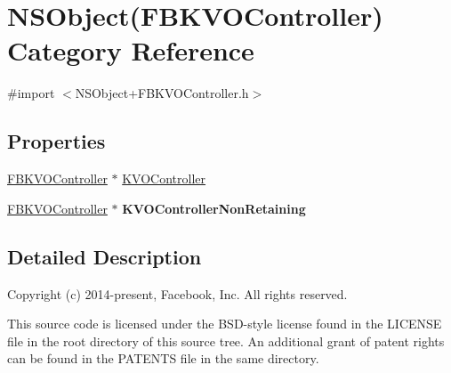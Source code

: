 \hypertarget{category_n_s_object_07_f_b_k_v_o_controller_08}{\section{N\+S\+Object(F\+B\+K\+V\+O\+Controller) Category Reference}
\label{category_n_s_object_07_f_b_k_v_o_controller_08}
}


{\ttfamily \#import $<$N\+S\+Object+\+F\+B\+K\+V\+O\+Controller.\+h$>$}

\subsection*{Properties}
\begin{DoxyCompactItemize}
\item 
\hyperlink{interface_f_b_k_v_o_controller}{F\+B\+K\+V\+O\+Controller} $\ast$ \hyperlink{category_n_s_object_07_f_b_k_v_o_controller_08_a1b8c562cef11b9d87f803d7721b5bd38}{K\+V\+O\+Controller}
\item 
\hypertarget{category_n_s_object_07_f_b_k_v_o_controller_08_a7cfc8c1392cd2d13d434ad1b7bdc4fe5}{\hyperlink{interface_f_b_k_v_o_controller}{F\+B\+K\+V\+O\+Controller} $\ast$ {\bfseries K\+V\+O\+Controller\+Non\+Retaining}}\label{category_n_s_object_07_f_b_k_v_o_controller_08_a7cfc8c1392cd2d13d434ad1b7bdc4fe5}

\end{DoxyCompactItemize}


\subsection{Detailed Description}
Copyright (c) 2014-\/present, Facebook, Inc. All rights reserved.

This source code is licensed under the B\+S\+D-\/style license found in the L\+I\+C\+E\+N\+S\+E file in the root directory of this source tree. An additional grant of patent rights can be found in the P\+A\+T\+E\+N\+T\+S file in the same directory. 

